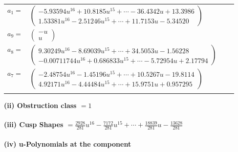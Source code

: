 \documentclass[1p]{elsarticle_modified}
\theoremstyle{definition}
\begin{document}
\begin{tabular}{m{7pt} m{180pt} m{7pt} m{180pt} }
\flushright $a_{1}=$&$\begin{pmatrix}-5.93594 u^{16}+10.8185 u^{15}+\cdots-36.4342 u+13.3986\\1.53381 u^{16}-2.51246 u^{15}+\cdots+11.7153 u-5.34520\end{pmatrix}$ \\
\flushright $a_{9}=$&$\begin{pmatrix}- u\\u\end{pmatrix}$ \\
\flushright $a_{8}=$&$\begin{pmatrix}9.30249 u^{16}-8.69039 u^{15}+\cdots+34.5053 u-1.56228\\-0.00711744 u^{16}+0.686833 u^{15}+\cdots-5.72954 u+2.17794\end{pmatrix}$ \\
\flushright $a_{7}=$&$\begin{pmatrix}-2.48754 u^{16}-1.45196 u^{15}+\cdots+10.5267 u-19.8114\\4.92171 u^{16}-4.44484 u^{15}+\cdots+15.9751 u+0.957295\end{pmatrix}$\\&\end{tabular}
\flushleft \textbf{(ii) Obstruction class $= 1$}\\~\\
\flushleft \textbf{(iii) Cusp Shapes $= \frac{2928}{281} u^{16}-\frac{7172}{281} u^{15}+\cdots+\frac{18839}{281} u-\frac{13628}{281}$}\\~\\
\newpage\renewcommand{\arraystretch}{1}
\flushleft \textbf{(iv) u-Polynomials at the component}\newline \\
\end{document}
